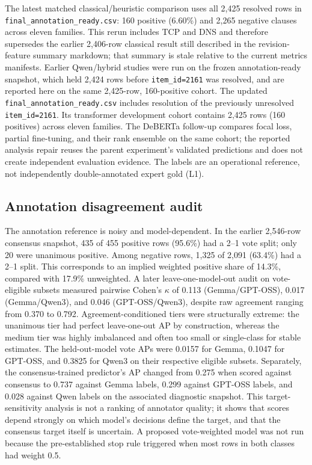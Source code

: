\documentclass[12pt,a4paper,oneside]{report}
\begin{document}
The latest matched classical/heuristic comparison uses all 2,425 resolved rows in \texttt{final\_annotation\_ready.csv}: 160 positive (6.60\%) and 2,265 negative clauses across eleven families. This rerun includes TCP and DNS and therefore supersedes the earlier 2,406-row classical result still described in the revision-feature summary markdown; that summary is stale relative to the current metrics manifests. Earlier Qwen/hybrid studies were run on the frozen annotation-ready snapshot, which held 2,424 rows before \texttt{item\_id=2161} was resolved, and are reported here on the same 2,425-row, 160-positive cohort. The updated \texttt{final\_annotation\_ready.csv} includes resolution of the previously unresolved \texttt{item\_id=2161}. Its transformer development cohort contains 2,425 rows (160 positives) across eleven families. The DeBERTa follow-up compares focal loss, partial fine-tuning, and their rank ensemble on the same cohort; the reported analysis repair reuses the parent experiment's validated predictions and does not create independent evaluation evidence. The labels are an operational reference, not independently double-annotated expert gold (L1).

\subsection{Annotation disagreement audit}

The annotation reference is noisy and model-dependent. In the earlier 2,546-row consensus snapshot, 435 of 455 positive rows (95.6\%) had a 2--1 vote split; only 20 were unanimous positive. Among negative rows, 1,325 of 2,091 (63.4\%) had a 2--1 split. This corresponds to an implied weighted positive share of 14.3\%, compared with 17.9\% unweighted. A later leave-one-model-out audit on vote-eligible subsets measured pairwise Cohen's $\kappa$ of 0.113 (Gemma/GPT-OSS), 0.017 (Gemma/Qwen3), and 0.046 (GPT-OSS/Qwen3), despite raw agreement ranging from 0.370 to 0.792. Agreement-conditioned tiers were structurally extreme: the unanimous tier had perfect leave-one-out AP by construction, whereas the medium tier was highly imbalanced and often too small or single-class for stable estimates. The held-out-model vote APs were 0.0157 for Gemma, 0.1047 for GPT-OSS, and 0.3825 for Qwen3 on their respective eligible subsets. Separately, the consensus-trained predictor's AP changed from 0.275 when scored against consensus to 0.737 against Gemma labels, 0.299 against GPT-OSS labels, and 0.028 against Qwen labels on the associated diagnostic snapshot. This target-sensitivity analysis is not a ranking of annotator quality; it shows that scores depend strongly on which model's decisions define the target, and that the consensus target itself is uncertain. A proposed vote-weighted model was not run because the pre-established stop rule triggered when most rows in both classes had weight 0.5.
\end{document}
